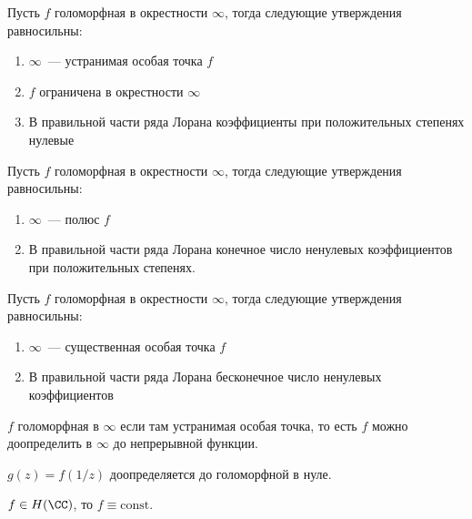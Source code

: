 \begin{observation}
    Пусть $f$ голоморфная в окрестности $\infty$, тогда
    следующие утверждения равносильны:

    \begin{enumerate}
        \item $\infty$~--- устранимая особая точка $f$
        \item $f$ ограничена в окрестности $\infty$
        \item В правильной части ряда Лорана
              коэффициенты при положительных степенях нулевые
    \end{enumerate}
\end{observation}

\begin{observation}
    Пусть $f$ голоморфная в окрестности $\infty$, тогда
    следующие утверждения равносильны:

    \begin{enumerate}
        \item $\infty$~--- полюс $f$
        \item В правильной части ряда Лорана
              конечное число ненулевых коэффициентов при положительных степенях.
    \end{enumerate}
\end{observation}

\begin{observation}
    Пусть $f$ голоморфная в окрестности $\infty$, тогда
    следующие утверждения равносильны:

    \begin{enumerate}
        \item $\infty$~--- существенная особая точка $f$
        \item В правильной части ряда Лорана
              бесконечное число ненулевых коэффициентов
    \end{enumerate}
\end{observation}

\begin{definition}
    $f$ голоморфная в $\infty$ если там устранимая
    особая точка, то есть $f$ можно доопределить
    в $\infty$ до непрерывной функции.
\end{definition}

\begin{observation}
    $g(z) = f(1/z)$ доопределяется до голоморфной в нуле.
\end{observation}

\begin{theorem}[Лиувилль]

    $f \in H(\CC)$, то $f \equiv \mathrm{const}$.
\end{theorem}


